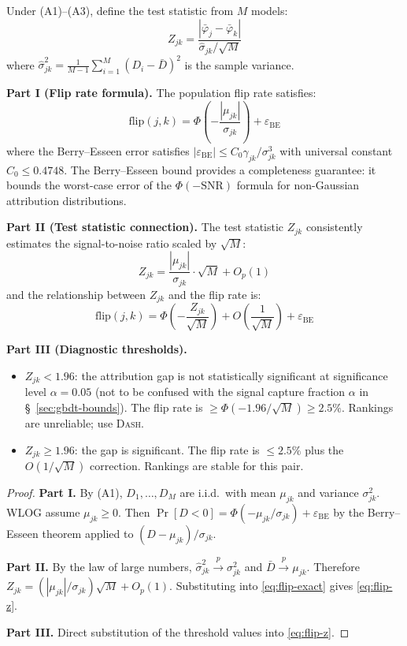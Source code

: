 \documentclass{jmlr}
\newcommand{\DASH}{\textsc{Dash}}
\begin{document}
\begin{theorem}
\label{thm:testable}
Under (A1)--(A3), define the test statistic from $M$ models:
\[
    Z_{jk} = \frac{|\bar\varphi_j - \bar\varphi_k|}{\hat\sigma_{jk}/\sqrt{M}}
\]
where $\hat\sigma_{jk}^2 = \frac{1}{M-1}\sum_{i=1}^M (D_i - \bar{D})^2$ is the sample variance.

\textbf{Part I (Flip rate formula).} The population flip rate satisfies:
\begin{equation}
\label{eq:flip-exact}
    \text{flip}(j,k) = \Phi\!\left(-\frac{|\mu_{jk}|}{\sigma_{jk}}\right) + \varepsilon_{\text{BE}}
\end{equation}
where the Berry--Esseen error satisfies $|\varepsilon_{\text{BE}}| \leq C_0 \gamma_{jk} / \sigma_{jk}^3$ with universal constant $C_0 \leq 0.4748$. The Berry--Esseen bound provides a completeness guarantee: it bounds the worst-case error of the $\Phi(-\text{SNR})$ formula for non-Gaussian attribution distributions.

\textbf{Part II (Test statistic connection).} The test statistic $Z_{jk}$ consistently estimates the signal-to-noise ratio scaled by $\sqrt{M}$:
\[
    Z_{jk} = \frac{|\mu_{jk}|}{\sigma_{jk}} \cdot \sqrt{M} + O_p(1)
\]
and the relationship between $Z_{jk}$ and the flip rate is:
\begin{equation}
\label{eq:flip-z}
    \text{flip}(j,k) = \Phi\!\left(-\frac{Z_{jk}}{\sqrt{M}}\right) + O\!\left(\frac{1}{\sqrt{M}}\right) + \varepsilon_{\text{BE}}
\end{equation}

\textbf{Part III (Diagnostic thresholds).}
\begin{itemize}
    \item $Z_{jk} < 1.96$: the attribution gap is not statistically significant at significance level $\alpha = 0.05$ (not to be confused with the signal capture fraction $\alpha$ in \S~\ref{sec:gbdt-bounds}). The flip rate is $\geq \Phi(-1.96/\sqrt{M}) \geq 2.5\%$. Rankings are unreliable; use \DASH{}.
    \item $Z_{jk} \geq 1.96$: the gap is significant. The flip rate is $\leq 2.5\%$ plus the $O(1/\sqrt{M})$ correction. Rankings are stable for this pair.
\end{itemize}
\end{theorem}

\begin{proof}
\textbf{Part I.} By (A1), $D_1, \ldots, D_M$ are i.i.d.\ with mean $\mu_{jk}$ and variance $\sigma_{jk}^2$. WLOG assume $\mu_{jk} \geq 0$. Then $\Pr[D < 0] = \Phi(-\mu_{jk}/\sigma_{jk}) + \varepsilon_{\text{BE}}$ by the Berry--Esseen theorem applied to $(D - \mu_{jk})/\sigma_{jk}$.

\textbf{Part II.} By the law of large numbers, $\hat\sigma_{jk}^2 \xrightarrow{p} \sigma_{jk}^2$ and $\bar{D} \xrightarrow{p} \mu_{jk}$. Therefore $Z_{jk} = (|\mu_{jk}|/\sigma_{jk})\sqrt{M} + O_p(1)$. Substituting into \eqref{eq:flip-exact} gives \eqref{eq:flip-z}.

\textbf{Part III.} Direct substitution of the threshold values into \eqref{eq:flip-z}.
\end{proof}
\end{document}
